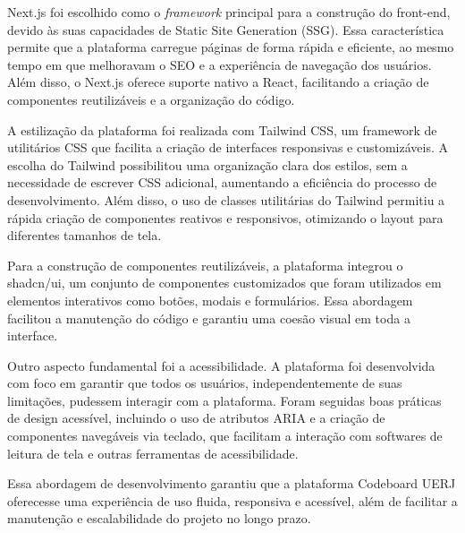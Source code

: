 Next.js foi escolhido como o \emph{framework} principal para a construção do front-end, devido às suas capacidades de Static Site Generation (SSG). Essa característica permite que a plataforma carregue páginas de forma rápida e eficiente, ao mesmo tempo em que melhoravam o SEO e a experiência de navegação dos usuários. Além disso, o Next.js oferece suporte nativo a React, facilitando a criação de componentes reutilizáveis e a organização do código.

A estilização da plataforma foi realizada com Tailwind CSS, um framework de utilitários CSS que facilita a criação de interfaces responsivas e customizáveis. A escolha do Tailwind possibilitou uma organização clara dos estilos, sem a necessidade de escrever CSS adicional, aumentando a eficiência do processo de desenvolvimento. Além disso, o uso de classes utilitárias do Tailwind permitiu a rápida criação de componentes reativos e responsivos, otimizando o layout para diferentes tamanhos de tela.

Para a construção de componentes reutilizáveis, a plataforma integrou o shadcn/ui, um conjunto de componentes customizados que foram utilizados em elementos interativos como botões, modais e formulários. Essa abordagem facilitou a manutenção do código e garantiu uma coesão visual em toda a interface.

Outro aspecto fundamental foi a acessibilidade. A plataforma foi desenvolvida com foco em garantir que todos os usuários, independentemente de suas limitações, pudessem interagir com a plataforma. Foram seguidas boas práticas de design acessível, incluindo o uso de atributos ARIA e a criação de componentes navegáveis via teclado, que facilitam a interação com softwares de leitura de tela e outras ferramentas de acessibilidade.

Essa abordagem de desenvolvimento garantiu que a plataforma Codeboard UERJ oferecesse uma experiência de uso fluida, responsiva e acessível, além de facilitar a manutenção e escalabilidade do projeto no longo prazo.

